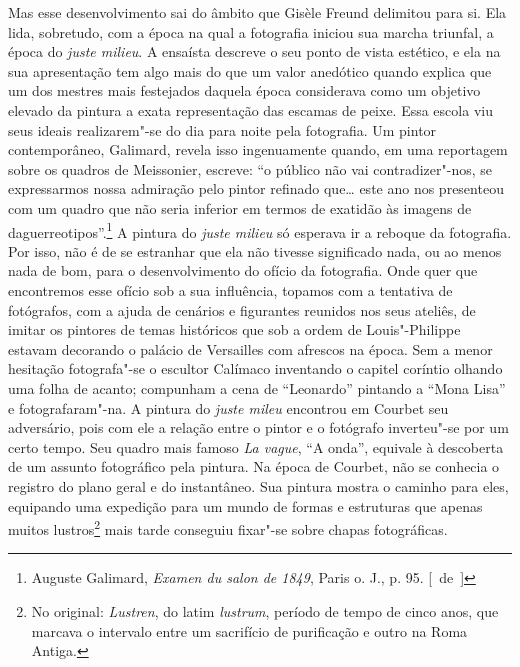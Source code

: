 Mas esse desenvolvimento sai do âmbito que Gisèle Freund delimitou
para si. Ela lida, sobretudo, com a época na qual a fotografia iniciou
sua marcha triunfal, a época do \emph{juste milieu}. A ensaísta
descreve o seu ponto de vista estético, e ela na sua apresentação tem algo mais do que um valor anedótico quando explica que
um dos mestres mais festejados daquela época considerava como um objetivo
elevado da pintura a exata representação das escamas de peixe. Essa
escola viu seus ideais realizarem"-se do dia para noite pela fotografia.
Um pintor contemporâneo, Galimard, revela isso ingenuamente quando, em
uma reportagem sobre os quadros de Meissonier, escreve: ``o público não
vai contradizer"-nos, se expressarmos nossa admiração pelo pintor
refinado que\ldots{} este ano nos presenteou com um quadro que não seria
inferior em termos de exatidão às imagens de daguerreotipos''.\footnote{Auguste Galimard,
  \emph{Examen du salon de 1849}, Paris o. J., p. 95. [~de~]} A pintura
do \emph{juste milieu} só esperava ir a reboque da
fotografia. Por isso, não é de se estranhar que ela não tivesse
significado nada, ou ao menos nada de bom, para o desenvolvimento do
ofício da fotografia. Onde quer que encontremos esse ofício sob a sua
influência, topamos com a tentativa de fotógrafos, com a ajuda de
cenários e figurantes reunidos nos seus ateliês, de imitar os
pintores de temas históricos que sob a ordem de Louis"-Philippe estavam decorando
o palácio de Versailles com afrescos na época. Sem a menor hesitação fotografa"-se o
escultor Calímaco inventando o capitel coríntio olhando
uma folha de acanto; compunham a cena de ``Leonardo'' pintando a ``Mona
Lisa'' e fotografaram"-na. A pintura do \emph{juste mileu} encontrou em
Courbet seu adversário, pois com ele a relação entre o pintor e o fotógrafo
inverteu"-se por um certo tempo. Seu quadro mais famoso \emph{La vague},
``A onda'', equivale à descoberta de um assunto fotográfico pela
pintura. Na época de Courbet, não se conhecia o registro do plano geral
e do instantâneo. Sua pintura mostra o caminho para eles, equipando uma
expedição para um mundo de formas e estruturas que apenas muitos
lustros\footnote{No original: \emph{Lustren}, do latim \emph{lustrum},
  período de tempo de cinco anos, que marcava o intervalo entre um
  sacrifício de purificação e outro na Roma Antiga. \versal{[N.~T.]}} mais tarde
conseguiu fixar"-se sobre chapas fotográficas.

